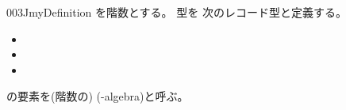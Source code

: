 \documentclass[index]{subfiles}
\begin{document}
\begin{myBlock}{003J}{myDefinition}
  を階数とする。
  型を
  次のレコード型と定義する。
  \begin{itemize}
  \item {}
  \item \myInlineMath{\myCircleAlgBase \myElemOf
    \myCircleAlgCarrier}
  \item \myInlineMath{\myCircleAlgLoop \myElemOf
    \myCircleAlgBase \myIdType \myCircleAlgBase}
  \end{itemize}
  の要素を(階数の)
  (\myInlineMath{\myCircle}-algebra)と呼ぶ。
\end{myBlock}
\end{document}
